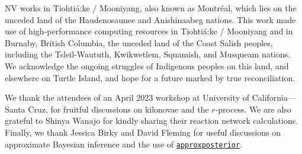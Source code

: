 \documentclass[twocolumn,twocolappendix]{aastex63}
\def\SPARK{\texttt{SPARK}}
\def\TARDIS{\texttt{TARDIS}}
\def\approxposterior{\texttt{approxposterior}}
\newcommand\redbf[1]{\textbf{\textcolor{red}{#1}}}
\begin{document}










\acknowledgments


NV works in Tiohti{\'a}:ke / Mooniyang, also known as Montr{\'e}al, which lies on the unceded land of the Haudenosaunee and Anishinaabeg nations. This work made use of high-performance computing resources in Tiohti{\'a}:ke / Mooniyang and in Burnaby, British Columbia, the unceded land of the Coast Salish peoples, including the Tsleil-Waututh, Kwikwetlem, Squamish, and Musqueam nations. We acknowledge the ongoing struggles of Indigenous peoples on this land, and elsewhere on Turtle Island, and hope for a future marked by true reconciliation. 

We thank the attendees of an April 2023 workshop at University of California---Santa Cruz, for fruitful discussions on kilonovae and the $r$-process. We are also grateful to Shinya Wanajo for kindly sharing their reaction network calculations. Finally, we thank Jessica Birky and David Fleming for useful discussions on approximate Bayesian inference and the use of \href{https://dflemin3.github.io/approxposterior/index.html}{\approxposterior}.
\end{document}

